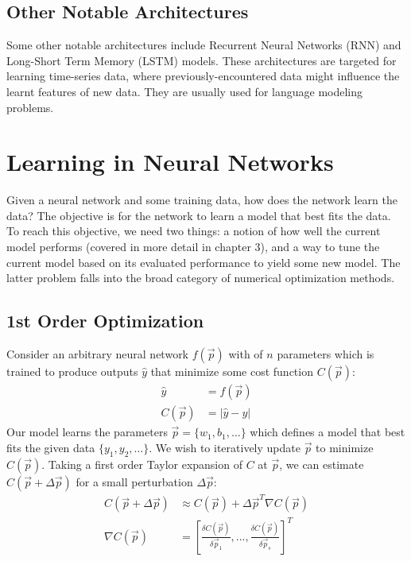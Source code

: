 \documentclass[paper=a4, fontsize=12pt]{scrartcl} %
\numberwithin{equation}{section} %
\numberwithin{figure}{section} %
\numberwithin{table}{section} %
\begin{document}
\subsection{Other Notable Architectures} %

Some other notable architectures include Recurrent Neural Networks (RNN) and Long-Short Term Memory (LSTM) models. These architectures are targeted for learning time-series data, where previously-encountered 
data might influence the learnt features of new data. They are usually used for language modeling problems.

\pagebreak


\section{Learning in Neural Networks}

Given a neural network and some training data, how does the network learn the data? 
The objective is for the network to learn a model that best fits the data. To reach this objective, we need 
two things: a notion of how well the current model performs (covered in more detail in chapter 3), and a way to tune
the current model based on its evaluated performance to yield some new model. The latter problem falls into the 
broad category of numerical optimization methods.


\subsection{1st Order Optimization}

Consider an arbitrary neural network $f(\vec{p})$ with of $n$ parameters which is trained to produce outputs $\hat{y}$ that minimize some cost function $C(\vec{p})$:
\begin{align*}
    \hat{y} &= f(\vec{p}) \\
    C(\vec{p}) &= | \hat{y} - y |
\end{align*}
Our model learns the parameters $\vec{p} = \{ w_1, b_1, \ldots \}$ which defines a model that best fits the given data $\{ y_1, y_2, \ldots \}$. We wish to iteratively update $\vec{p}$
to minimize $C(\vec{p})$. Taking a first order Taylor expansion of $C$ at $\vec{p}$, we can estimate $C(\vec{p} + \Delta \vec{p})$ for a small perturbation $\Delta \vec{p}$:
\begin{align*}
    C(\vec{p} + \Delta \vec{p}) &\approx C(\vec{p}) +  \Delta \vec{p}^T \nabla C(\vec{p}) \\
    \nabla C(\vec{p}) &= \left[ \frac{\delta C(\vec{p})}{\delta \vec{p}_1}, ..., \frac{\delta C(\vec{p})}{\delta \vec{p}_s} \right]^T
\end{align*}
\end{document}
